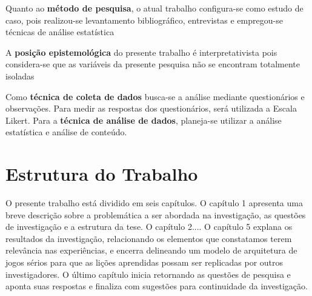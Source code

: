 Quanto ao \textbf{método de pesquisa}, o atual trabalho configura-se como estudo de caso, pois realizou-se levantamento bibliográfico, entrevistas e empregou-se técnicas de análise estatística %

A \textbf{posição epistemológica} do presente trabalho é interpretativista pois considera-se que as variáveis da presente pesquisa não se encontram totalmente isoladas %

Como \textbf{técnica de coleta de dados} busca-se a análise mediante questionários e observações. Para medir as respostas dos questionários, será utilizada a Escala Likert. Para a \textbf{técnica de análise de dados}, planeja-se utilizar a análise estatística e análise de conteúdo.





\section{Estrutura do Trabalho}\label{ch:Estrutura}

O presente trabalho está dividido em seis capítulos. O capítulo 1 apresenta uma breve
descrição sobre a problemática a ser abordada na investigação, as questões de
investigação e a estrutura da tese. O capítulo 2....  O capítulo 5
explana os resultados da investigação, relacionando os elementos que constatamos
terem relevância nas experiências, e encerra delineando um modelo de arquitetura de
jogos sérios para que as lições aprendidas possam ser replicadas por outros
investigadores. O último capítulo inicia retornando as questões de pesquisa e aponta
suas respostas e finaliza com sugestões para continuidade da investigação. 

\newpage




